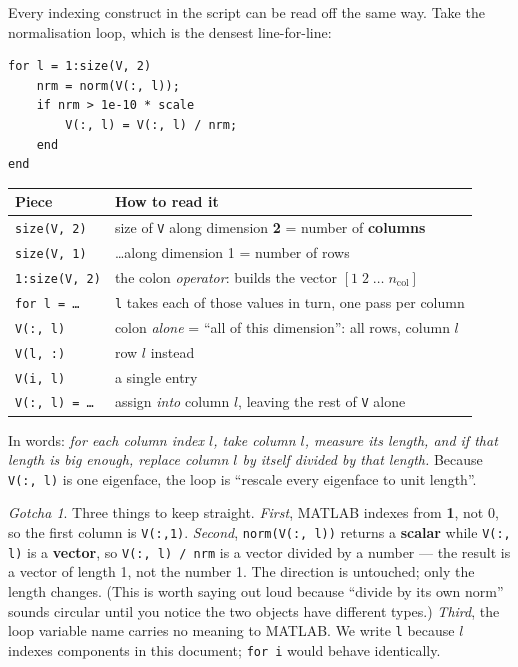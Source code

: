 \documentclass[11pt]{article}
\theoremstyle{definition}
\theoremstyle{remark}
\newtheorem*{gotcha}{Gotcha}
\begin{document}
Every indexing construct in the script can be read off the same way. Take the
normalisation loop, which is the densest line-for-line:
\begin{lstlisting}
for l = 1:size(V, 2)
    nrm = norm(V(:, l));
    if nrm > 1e-10 * scale
        V(:, l) = V(:, l) / nrm;
    end
end
\end{lstlisting}

\begin{center}
\begin{tabular}{ll}
\toprule
Piece & How to read it \\
\midrule
\texttt{size(V, 2)}     & size of \texttt{V} along dimension \textbf{2} = number of \textbf{columns} \\
\texttt{size(V, 1)}     & \ldots along dimension 1 = number of rows \\
\texttt{1:size(V, 2)}   & the colon \emph{operator}: builds the vector $[1\;2\;\ldots\;n_{\text{col}}]$ \\
\texttt{for l = \ldots} & \texttt{l} takes each of those values in turn, one pass per column \\
\texttt{V(:, l)}        & colon \emph{alone} = ``all of this dimension'': all rows, column $l$ \\
\texttt{V(l, :)}        & row $l$ instead \\
\texttt{V(i, l)}        & a single entry \\
\texttt{V(:, l) = \ldots} & assign \emph{into} column $l$, leaving the rest of \texttt{V} alone \\
\bottomrule
\end{tabular}
\end{center}

In words: \emph{for each column index $l$, take column $l$, measure its length,
and if that length is big enough, replace column $l$ by itself divided by that
length.} Because \texttt{V(:, l)} is one eigenface, the loop is ``rescale every
eigenface to unit length''.

\begin{gotcha}
Three things to keep straight.
\emph{First}, MATLAB indexes from \textbf{1}, not 0, so the first column is
\texttt{V(:,1)}.
\emph{Second}, \texttt{norm(V(:, l))} returns a \textbf{scalar} while
\texttt{V(:, l)} is a \textbf{vector}, so \texttt{V(:, l) / nrm} is a vector
divided by a number --- the result is a vector of length 1, not the number 1. The
direction is untouched; only the length changes. (This is worth saying out loud
because ``divide by its own norm'' sounds circular until you notice the two
objects have different types.)
\emph{Third}, the loop variable name carries no meaning to MATLAB. We write
\texttt{l} because $l$ indexes components in this document; \texttt{for i} would
behave identically.
\end{gotcha}
\end{document}
